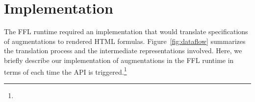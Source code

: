 \section{Implementation}\label{sec:impl}

The FFL runtime required an implementation that would translate specifications of augmentations to rendered HTML formulas. Figure~\ref{fig:dataflow} summarizes the translation process and the intermediate representations involved. Here, we briefly describe our implementation of augmentations in the FFL runtime in terms of each time the API is triggered.\footnote{}


